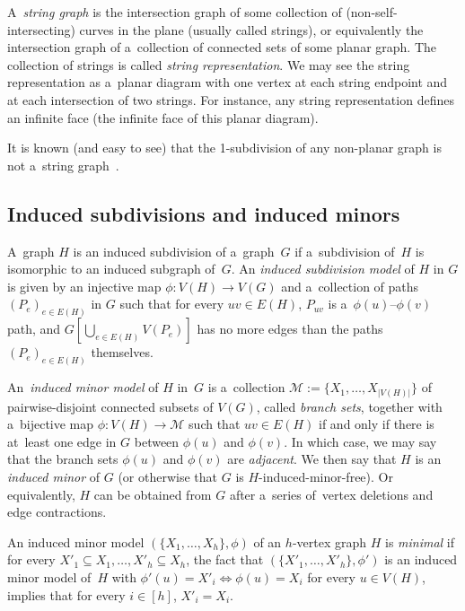 \documentclass[a4paper,UKenglish,cleveref,autoref]{lipics-v2021}
\begin{document}
A~\emph{string graph} is the intersection graph of some collection of (non-self-intersecting) curves in the plane (usually called strings), or equivalently the intersection graph of a~collection of connected sets of some planar graph.
The collection of strings is called \emph{string representation}.
We may see the string representation as a~planar diagram with one vertex at each string endpoint and at each intersection of two strings.
For instance, any string representation defines an infinite face (the infinite face of this planar diagram).

It is known (and easy to see) that the 1-subdivision of any non-planar graph is not a~string graph~\cite{Sinden66}.

\subsection{Induced subdivisions and induced minors}\label{sec:induced-subd-min}

A~graph $H$ is an induced subdivision of a~graph~$G$ if a~subdivision of~$H$ is isomorphic to an induced subgraph of~$G$.
An \emph{induced subdivision model} of $H$ in $G$ is given by an injective map $\phi: V(H) \to V(G)$ and a~collection of paths $(P_e)_{e \in E(H)}$ in $G$ such that for every $uv \in E(H)$, $P_{uv}$ is a~$\phi(u)$--$\phi(v)$ path, and $G[\bigcup_{e \in E(H)} V(P_e)]$ has no more edges than the paths $(P_e)_{e \in E(H)}$ themselves. 

An~\emph{induced minor model} of $H$ in~$G$ is a~collection $\mathcal M := \{X_1, \ldots, X_{|V(H)|}\}$ of pairwise-disjoint connected subsets of $V(G)$, called \emph{branch sets}, together with a~bijective map $\phi: V(H) \to \mathcal M$ such that $uv \in E(H)$ if and only if there is at~least one edge in $G$ between $\phi(u)$ and $\phi(v)$.
In which case, we may say that the branch sets $\phi(u)$ and $\phi(v)$ are \emph{adjacent}.
We then say that $H$ is an \emph{induced minor} of $G$ (or otherwise that $G$ is $H$-induced-minor-free).
Or equivalently, $H$ can be obtained from $G$ after a~series of~vertex deletions and edge contractions.

An induced minor model $(\{X_1, \ldots, X_h\}, \phi)$ of an $h$-vertex graph $H$ is \emph{minimal} if for every $X'_1 \subseteq X_1, \ldots, X'_h \subseteq X_h$, the fact that $(\{X'_1, \ldots, X'_h\}, \phi')$ is an induced minor model of~$H$ with $\phi'(u) = X'_i \Leftrightarrow \phi(u) = X_i$ for every $u \in V(H)$, implies that for every $i \in [h]$, $X'_i = X_i$.
\end{document}
